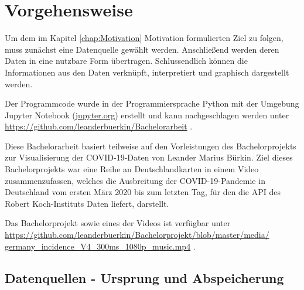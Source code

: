 \chapter{Vorgehensweise}\label{chap:Vorgehensweise}
Um dem im Kapitel \glqq{}\ref{chap:Motivation} Motivation\grqq{} formulierten Ziel zu folgen, muss zunächst eine Datenquelle gewählt werden.
Anschließend werden deren Daten in eine nutzbare Form übertragen.
Schlussendlich können die Informationen aus den Daten verknüpft, interpretiert und graphisch dargestellt werden.

Der Programmcode wurde in der Programmiersprache Python mit der Umgebung Jupyter Notebook (\href{jupyter.org}{jupyter.org}) erstellt und kann nachgeschlagen werden unter\\
\href{https://github.com/leanderbuerkin/Bachelorarbeit}{https://github.com/leanderbuerkin/Bachelorarbeit} .


Diese Bachelorarbeit basiert teilweise auf den Vorleistungen des Bachelorprojekts zur Visualisierung der COVID-19-Daten von Leander Marius Bürkin.
Ziel dieses Bachelorprojekts war eine Reihe an Deutschlandkarten in einem Video zusammenzufassen, welches die Ausbreitung der COVID-19-Pandemie in Deutschland vom ersten März 2020 bis zum letzten Tag, für den die API des Robert Koch-Instituts Daten liefert, darstellt.


Das Bachelorprojekt sowie eines der Videos ist verfügbar unter\\
\href{https://github.com/leanderbuerkin/Bachelorprojekt/blob/master/media/germany_incidence_V4_300ms_1080p_music.mp4}{https://github.com/leanderbuerkin/Bachelorprojekt/blob/master/media/}\\
\href{https://github.com/leanderbuerkin/Bachelorprojekt/blob/master/media/germany_incidence_V4_300ms_1080p_music.mp4}{germany\_incidence\_V4\_300ms\_1080p\_music.mp4} .

\section{Datenquellen - Ursprung und Abspeicherung}\label{sec:Datenquelle}

